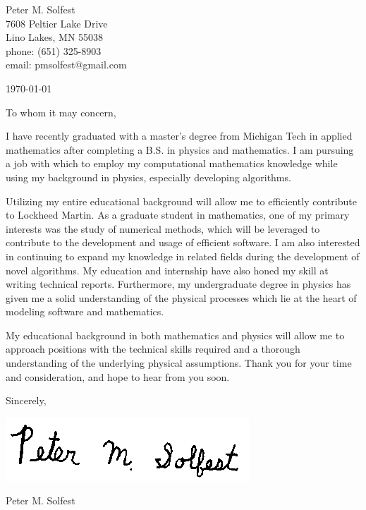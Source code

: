 \documentclass[letterpaper,12pt]{article}
\begin{document}
Peter M. Solfest\\
7608 Peltier Lake Drive\\
Lino Lakes, MN 55038\\
phone: (651) 325-8903\\
email: pmsolfest@gmail.com

\today


To whom it may concern, %

I have recently graduated with a master's degree from Michigan Tech in applied mathematics after
completing a B.S. in physics and mathematics.
I am pursuing a job with which to employ my computational mathematics knowledge
while using my background in physics, especially developing algorithms.

Utilizing my entire educational background will allow me to efficiently
contribute to Lockheed Martin.
As a graduate student in mathematics, one of my primary interests was the study of numerical methods,
which will be leveraged to contribute to the development and usage of efficient software.
I am also interested in continuing to expand my knowledge in related
fields during the development of novel algorithms.
My education and internship have also honed my skill at writing technical reports.
Furthermore, my undergraduate degree in physics has given me a solid understanding of the
physical processes which lie at the heart of modeling software and mathematics.

My educational background in both mathematics and physics will allow 
me to approach positions with the technical skills required and a thorough understanding
of the underlying physical assumptions.
Thank you for your time and consideration, and hope to hear from you soon.

Sincerely,

\includegraphics[height=.5in]{signature.png}

Peter M. Solfest
\end{document}
